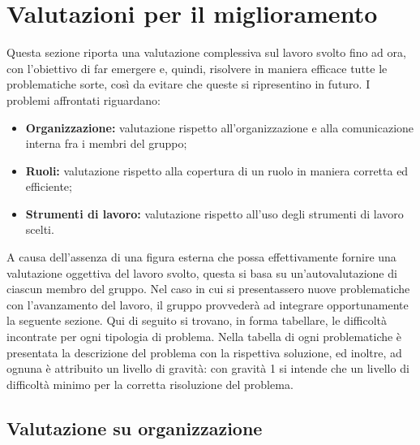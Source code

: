 \chapter{Valutazioni per il miglioramento} \label{ValutazionePerIlMiglioramento}
Questa sezione riporta una valutazione complessiva sul lavoro svolto fino ad ora, con l’obiettivo di far emergere e, quindi, risolvere in maniera efficace tutte le problematiche sorte, così da evitare che queste si ripresentino in futuro. 
I problemi affrontati riguardano: 
\begin{itemize}
\item \textbf{Organizzazione:} valutazione rispetto all'organizzazione e alla comunicazione interna fra i membri del gruppo;
\item \textbf{Ruoli:} valutazione rispetto alla copertura di un ruolo in maniera corretta ed efficiente;
\item \textbf{Strumenti di lavoro:} valutazione rispetto all’uso degli strumenti di lavoro scelti.
\end{itemize}
A causa dell’assenza di una figura esterna che possa effettivamente fornire una valutazione oggettiva del lavoro svolto, questa si basa su un'autovalutazione di ciascun membro del gruppo. 
Nel caso in cui si presentassero nuove problematiche con l’avanzamento del lavoro, il gruppo provvederà ad integrare opportunamente la seguente sezione.
Qui di seguito si trovano, in forma tabellare, le difficoltà incontrate per ogni tipologia di problema. Nella tabella di ogni problematiche è presentata la descrizione del problema con la rispettiva soluzione, ed inoltre, ad ognuna è attribuito un livello di gravità: con gravità 1 si intende che un livello di difficoltà minimo per la corretta risoluzione del problema. 

\section{Valutazione su organizzazione} \label{6.1}

